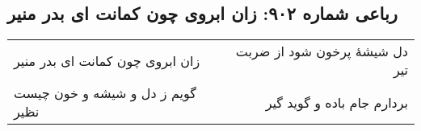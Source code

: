 \begin{center}
\section*{رباعی شماره ۹۰۲: زان ابروی چون کمانت ای بدر منیر}
\label{sec:0902}
\begin{longtable}{l p{0.5cm} r}
زان ابروی چون کمانت ای بدر منیر
&&
دل شیشهٔ پرخون شود از ضربت تیر
\\
گویم ز دل و شیشه و خون چیست نظیر
&&
بردارم جام باده و گوید گیر
\\
\end{longtable}
\end{center}
